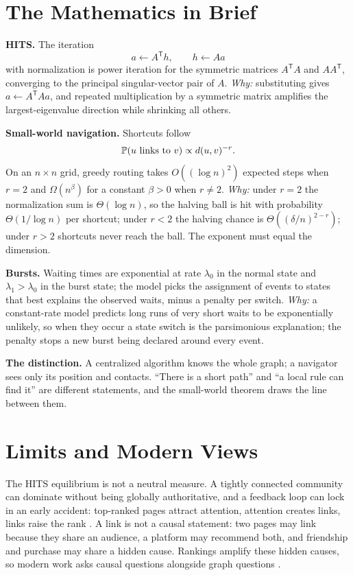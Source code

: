 \section{The Mathematics in Brief}
\textbf{HITS.} The iteration
\[
a\leftarrow A^{\mathsf T}h,\qquad h\leftarrow Aa
\]
with normalization is power iteration for the symmetric matrices $A^{\mathsf T}A$ and $AA^{\mathsf T}$, converging to the principal singular-vector pair of $A$. \emph{Why:} substituting gives $a\leftarrow A^{\mathsf T}Aa$, and repeated multiplication by a symmetric matrix amplifies the largest-eigenvalue direction while shrinking all others.

\textbf{Small-world navigation.} Shortcuts follow
\[
\mathbb{P}(u\text{ links to }v)\propto d(u,v)^{-r}.
\]
On an $n\times n$ grid, greedy routing takes $O((\log n)^2)$ expected steps when $r=2$ and $\Omega(n^{\beta})$ for a constant $\beta>0$ when $r\ne2$. \emph{Why:} under $r=2$ the normalization sum is $\Theta(\log n)$, so the halving ball is hit with probability $\Theta(1/\log n)$ per shortcut; under $r<2$ the halving chance is $\Theta((\delta/n)^{2-r})$; under $r>2$ shortcuts never reach the ball. The exponent must equal the dimension.

\textbf{Bursts.} Waiting times are exponential at rate $\lambda_0$ in the normal state and $\lambda_1>\lambda_0$ in the burst state; the model picks the assignment of events to states that best explains the observed waits, minus a penalty per switch. \emph{Why:} a constant-rate model predicts long runs of very short waits to be exponentially unlikely, so when they occur a state switch is the parsimonious explanation; the penalty stops a new burst being declared around every event.

\textbf{The distinction.} A centralized algorithm knows the whole graph; a navigator sees only its position and contacts. ``There is a short path'' and ``a local rule can find it'' are different statements, and the small-world theorem draws the line between them.

\section{Limits and Modern Views}
The HITS equilibrium is not a neutral measure. A tightly connected community can dominate without being globally authoritative, and a feedback loop can lock in an early accident: top-ranked pages attract attention, attention creates links, links raise the rank \cite{kleinberg-hits}. A link is not a causal statement: two pages may link because they share an audience, a platform may recommend both, and friendship and purchase may share a hidden cause. Rankings amplify these hidden causes, so modern work asks causal questions alongside graph questions \cite{kleinberg-smallworld}.

